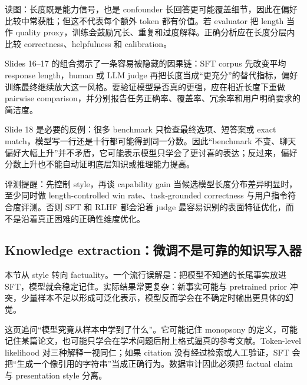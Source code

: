 \begin{knowledgebox}{读图：长度既是能力信号，也是 confounder}
长回答更可能覆盖细节，因此在偏好比较中常获胜；但这不代表每个额外 token 都有价值。若 evaluator 把 length 当作 quality proxy，训练会鼓励冗长、重复和过度解释。正确分析应在长度分层内比较 correctness、helpfulness 和 calibration。
\end{knowledgebox}

Slides 16--17 的组合揭示了一条容易被隐藏的因果链：SFT corpus 先改变平均 response length，human 或 LLM judge 再把长度当成“更充分”的替代指标，偏好训练最终继续放大这一风格。要验证模型是否真的更强，应在相近长度下重做 pairwise comparison，并分别报告任务正确率、覆盖率、冗余率和用户明确要求的简洁度。


Slide 18 是必要的反例：很多 benchmark 只检查最终选项、短答案或 exact match，模型写一行还是十行都可能得到同一分数。因此“benchmark 不变、聊天偏好大幅上升”并不矛盾，它可能表示模型只学会了更讨喜的表达；反过来，偏好分数上升也不能自动证明底层知识或推理能力提高。

\begin{warningbox}{评测提醒：先控制 style，再谈 capability gain}
当候选模型长度分布差异明显时，至少同时做 length-controlled win rate、task-grounded correctness 与用户指令符合度评测。否则 SFT 和 RLHF 都会沿着 judge 最容易识别的表面特征优化，而不是沿着真正困难的正确性维度优化。
\end{warningbox}

\subsection{Knowledge extraction：微调不是可靠的知识写入器}

本节从 style 转向 factuality。一个流行误解是：把模型不知道的长尾事实放进 SFT，模型就会稳定记住。实际结果常更复杂：新事实可能与 pretrained prior 冲突，少量样本不足以形成可泛化表示，模型反而学会在不确定时输出更具体的幻觉。


这页追问“模型究竟从样本中学到了什么”。它可能记住 monopsony 的定义，可能记住某篇论文，也可能只学会在学术问题后附上格式逼真的参考文献。Token-level likelihood 对三种解释一视同仁；如果 citation 没有经过检索或人工验证，SFT 会把“生成一个像引用的字符串”当成正确行为。数据审计因此必须把 factual claim 与 presentation style 分离。

